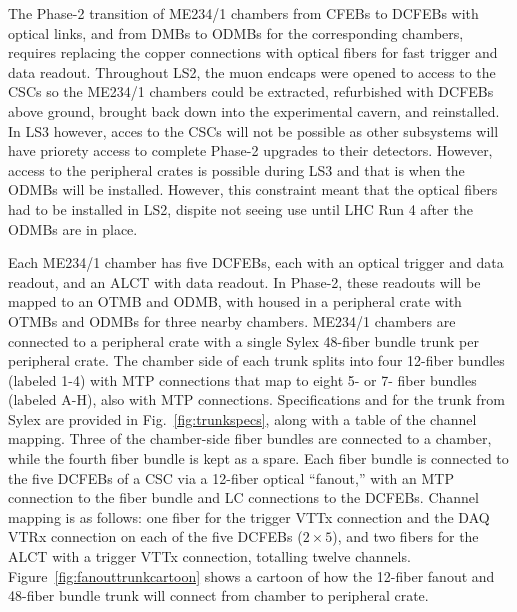 
The Phase-2 transition of ME234/1 chambers from CFEBs to DCFEBs with optical links, and from DMBs to ODMBs for the corresponding chambers, requires replacing the copper connections with optical fibers for fast trigger and data readout. Throughout LS2, the muon endcaps were opened to access to the CSCs so the ME234/1 chambers could be extracted, refurbished with DCFEBs above ground, brought back down into the experimental cavern, and reinstalled. In LS3 however, acces to the CSCs will not be possible as other subsystems will have priorety access to complete Phase-2 upgrades to their detectors. However, access to the peripheral crates is possible during LS3 and that is when the ODMBs will be installed. However, this constraint meant that the optical fibers had to be installed in LS2, dispite not seeing use until LHC Run 4 after the ODMBs are in place.

Each ME234/1 chamber has five DCFEBs, each with an optical trigger and data readout, and an ALCT with data readout. In Phase-2, these readouts will be mapped to an OTMB and ODMB, with housed in a peripheral crate with OTMBs and ODMBs for three nearby chambers. ME234/1 chambers are connected to a peripheral crate with a single Sylex 48-fiber bundle trunk per peripheral crate. The chamber side of each trunk splits into four 12-fiber bundles (labeled 1-4) with MTP connections that map to eight 5- or 7- fiber bundles (labeled A-H), also with MTP connections. Specifications and for the trunk from Sylex are provided in Fig.~\ref{fig:trunkspecs}, along with a table of the channel mapping. Three of the chamber-side fiber bundles are connected to a chamber, while the fourth fiber bundle is kept as a spare. Each fiber bundle is connected to the five DCFEBs of a CSC via a 12-fiber optical ``fanout,'' with an MTP connection to the fiber bundle and LC connections to the DCFEBs. Channel mapping is as follows: one fiber for the trigger VTTx connection and the DAQ VTRx connection on each of the five DCFEBs ($2\times 5$), and two fibers for the ALCT with a trigger VTTx connection, totalling twelve channels. Figure~\ref{fig:fanouttrunkcartoon} shows a cartoon of how the 12-fiber fanout and 48-fiber bundle trunk will connect from chamber to peripheral crate.


